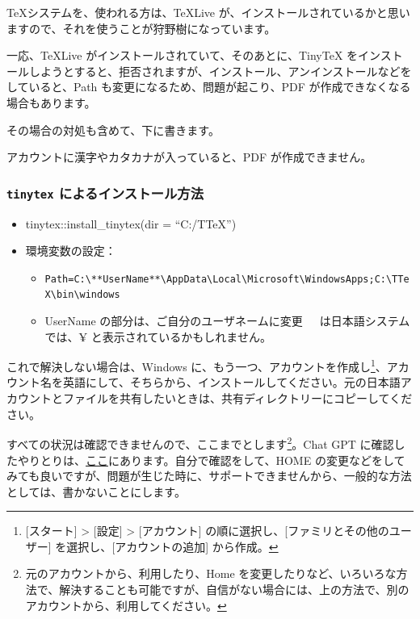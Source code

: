 \documentclass[
  xelatex, ja=standard]{bxjsbook}
\providecommand{\tightlist}{%
  \setlength{\itemsep}{0pt}\setlength{\parskip}{0pt}}
\theoremstyle{definition}
\theoremstyle{definition}
\theoremstyle{definition}
\theoremstyle{definition}
\theoremstyle{remark}
\begin{document}
\TeX システムを、使われる方は、TeXLive が、インストールされているかと思いますので、それを使うことが狩野樹になっています。

一応、TeXLive がインストールされていて、そのあとに、TinyTeX をインストールしようとすると、拒否されますが、インストール、アンインストールなどをしていると、Path も変更になるため、問題が起こり、PDF が作成できなくなる場合もあります。

その場合の対処も含めて、下に書きます。

アカウントに漢字やカタカナが入っていると、PDF が作成できません。

\hypertarget{tinytex-ux306bux3088ux308bux30a4ux30f3ux30b9ux30c8ux30fcux30ebux65b9ux6cd5}{%
\subsubsection{\texorpdfstring{\texttt{tinytex} によるインストール方法}{tinytex によるインストール方法}}\label{tinytex-ux306bux3088ux308bux30a4ux30f3ux30b9ux30c8ux30fcux30ebux65b9ux6cd5}}

\begin{itemize}
\tightlist
\item
  tinytex::install\_tinytex(dir = ``C:/TTeX'')
\item
  環境変数の設定：

  \begin{itemize}
  \tightlist
  \item
    \texttt{Path=C:\textbackslash{}**UserName**\textbackslash{}AppData\textbackslash{}Local\textbackslash{}Microsoft\textbackslash{}WindowsApps;C:\textbackslash{}TTeX\textbackslash{}bin\textbackslash{}windows}
  \item
    UserName の部分は、ご自分のユーザネームに変更　~は日本語システムでは、¥ と表示されているかもしれません。
  \end{itemize}
\end{itemize}

これで解決しない場合は、Windows に、もう一つ、アカウントを作成し\footnote{{[}スタート{]} \textgreater{} {[}設定{]} \textgreater{} {[}アカウント{]} の順に選択し、{[}ファミリとその他のユーザー{]} を選択し、{[}アカウントの追加{]} から作成。}、アカウント名を英語にして、そちらから、インストールしてください。元の日本語アカウントとファイルを共有したいときは、共有ディレクトリーにコピーしてください。

すべての状況は確認できませんので、ここまでとします\footnote{元のアカウントから、利用したり、Home を変更したりなど、いろいろな方法で、解決することも可能ですが、自信がない場合には、上の方法で、別のアカウントから、利用してください。}。Chat GPT に確認したやりとりは、\href{https://icu-hsuzuki.github.io/ds_education/chatgpt.html\#chatgpt}{ここ}にあります。自分で確認をして、HOME の変更などをしてみても良いですが、問題が生じた時に、サポートできませんから、一般的な方法としては、書かないことにします。
\end{document}
